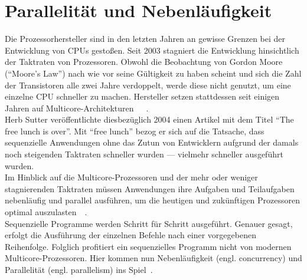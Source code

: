 \pagebreak

\section{Parallelität und Nebenläufigkeit}
Die Prozessorhersteller sind in den letzten Jahren an gewisse Grenzen bei der Entwicklung von CPUs gestoßen. Seit 2003 stagniert die Entwicklung hinsichtlich der Taktraten von Prozessoren. Obwohl die Beobachtung von Gordon Moore (\enquote{Moore's Law}) nach wie vor seine Gültigkeit zu haben scheint und sich die Zahl der Transistoren alle zwei Jahre verdoppelt, werde diese nicht genutzt, um eine einzelne CPU schneller zu machen. Hersteller setzen stattdessen seit einigen Jahren auf Multicore-Architekturen~\cite[S.~1]{butcher_seven_2014}~\cite[S.~108]{vernon_reactive_2016}~\cite{sutter_free_2004}.\\
Herb Sutter veröffentlichte diesbezüglich 2004 einen Artikel mit dem Titel \enquote{The free lunch is over}. Mit \enquote{free lunch} bezog er sich auf die Tatsache, dass sequenzielle Anwendungen ohne das Zutun von Entwicklern aufgrund der damals noch steigenden Taktraten schneller wurden --- vielmehr schneller ausgeführt wurden.\\
Im Hinblick auf die Multicore-Prozessoren und der mehr oder weniger stagnierenden Taktraten müssen Anwendungen ihre Aufgaben und Teilaufgaben nebenläufig und parallel ausführen, um die heutigen und zukünftigen Prozessoren optimal auszulasten~\cite{sutter_free_2004}~\cite[S.~1]{butcher_seven_2014}.\\
Sequenzielle Programme werden Schritt für Schritt ausgeführt. Genauer gesagt, erfolgt die Ausführung der einzelnen Befehle nach einer vorgegebenen Reihenfolge. Folglich profitiert ein sequenzielles Programm nicht von modernen Multicore-Prozessoren. Hier kommen nun Nebenläufigkeit (engl. concurrency) und Parallelität (engl. parallelism) ins Spiel~\cite[S.~3]{butcher_seven_2014}.\\

